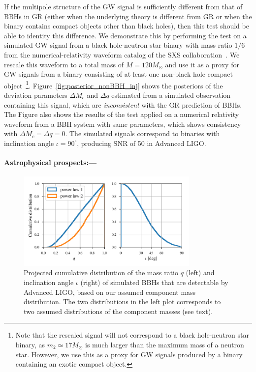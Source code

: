 \documentclass[prl,preprintnumbers,twocolumn,eqsecnum,floatfix,a4paper,nofootinbib,superscriptaddress]{revtex4}
\begin{document}
If the multipole structure of the GW signal is sufficiently different from that of BBHs in GR (either when the underlying theory is different from GR or when the binary contains compact objects other than black holes), then this test should be able to identity this difference. We demonstrate this by performing the test on a simulated GW signal from a black hole-neutron star binary with mass ratio ${1/6}$ from the numerical-relativity waveform catalog of the SXS collaboration~\cite{SXS-Catalog}. We rescale this waveform to a total mass of $M = 120 M_\odot$ and use it as a proxy for GW signals from a binary consisting of at least one non-black hole compact object~\footnote{Note that the rescaled signal will not correspond to a black hole-neutron star binary, as $m_2 \simeq 17 M_\odot$ is much larger than the maximum mass of a neutron star. However, we use this as a proxy for GW signals produced by a binary containing an exotic compact object.}. Figure~\ref{fig:posterior_nonBBH_inj} shows the posteriors of the deviation parameters $\Delta M_c$ and $\Delta q$ estimated from a simulated observation containing this signal, which are \emph{inconsistent} with the GR prediction of BBHs. The Figure also shows the results of the test applied on a numerical relativity waveform from a BBH system with same parameters, which shows consistency with $\Delta M_c = \Delta q = 0$. The simulated signals correspond to binaries with inclination angle $\iota = 90^\circ$, producing SNR of 50 in Advanced LIGO. 

\paragraph{Astrophysical prospects:---} 

\begin{figure}[tbh]
	\includegraphics*[width=3.5in]{figs/q_and_iota_dist.pdf}
	\caption{Projected cumulative distribution of the mass ratio $q$ (left) and inclination angle $\iota$ (right) of simulated BBHs that are detectable by Advanced LIGO, based on our assumed component mass distribution. The two distributions in the left plot corresponds to two assumed distributions of the component masses (see text).}
	\label{fig:q_iota_distribution}
\end{figure}
\end{document}
